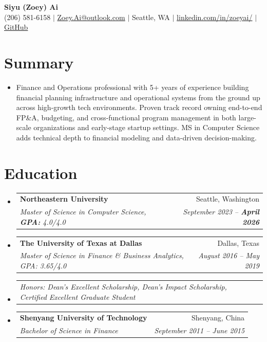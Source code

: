 \documentclass[letterpaper,10pt]{article}
\makeatletter
\newcommand{\resumeSubheading}[4]{
  \vspace{-2pt}\item
  \begin{tabular*}{0.97\textwidth}[t]{l@{\extracolsep{\fill}}r}
    \textbf{#1} & #2 \\
    \textit{\small#3} & \textit{\small #4} \\
  \end{tabular*}\vspace{-9pt}}
\newcommand{\resumeSubSubheading}[2]{
  \item\begin{tabular*}{0.97\textwidth}{l@{\extracolsep{\fill}}r}
    \textit{\small#1} & \textit{\small #2} \\
  \end{tabular*}\vspace{-7pt}}
\newcommand{\resumeSubHeadingListStart}{\begin{itemize}[leftmargin=0.15in,label={}]}
\newcommand{\resumeSubHeadingListEnd}{\end{itemize}}
\makeatother
\begin{document}
\begin{center}
  {\LARGE \textbf{Siyu (Zoey) Ai}} \\[3pt]
  \small
  (206) 581-6158 $\mid$
  \href{mailto:Zoey.Ai@outlook.com}{Zoey.Ai@outlook.com} $\mid$
  Seattle, WA $\mid$
  \href{https://www.linkedin.com/in/zoeyai/}{linkedin.com/in/zoeyai/} $\mid$
  \href{https://github.com/zoeyai1221}{GitHub}
\end{center}

\section{Summary}
\resumeSubHeadingListStart
  \item\small{Finance and Operations professional with 5+ years of experience building financial planning infrastructure and operational systems from the ground up across high-growth tech environments. Proven track record owning end-to-end FP\&A, budgeting, and cross-functional program management in both large-scale organizations and early-stage startup settings. MS in Computer Science adds technical depth to financial modeling and data-driven decision-making.
}
\resumeSubHeadingListEnd

\vspace{-15pt}

\section{Education}
\resumeSubHeadingListStart
  \resumeSubheading{Northeastern University}{Seattle, Washington}{Master of Science in Computer Science, \textbf{ GPA: }4.0/4.0}{September 2023 -- \textbf{April 2026}}
  \resumeSubheading{The University of Texas at Dallas}{Dallas, Texas}{Master of Science in Finance \& Business Analytics, GPA: 3.65/4.0}{August 2016 -- May 2019}
  \resumeSubSubheading{Honors: Dean's Excellent Scholarship, Dean's Impact Scholarship, Certified Excellent Graduate Student}{}
  \vspace{0pt}
  \resumeSubheading{Shenyang University of Technology}{Shenyang, China}{Bachelor of Science in Finance}{September 2011 -- June 2015}
\resumeSubHeadingListEnd

\vspace{-6pt}
\end{document}
